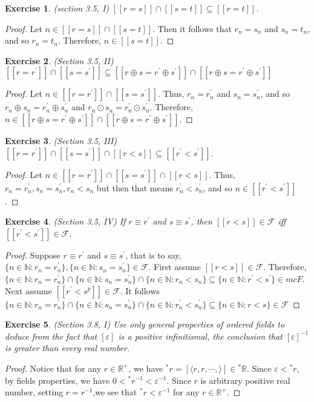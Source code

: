\documentclass[a4paper, 11pt, openany]{book}
\theoremstyle{plain}
\newtheorem{exercise}{Exercise}[chapter]
\theoremstyle{plain}
\newcommand{\mc}{\mathcal}
\newcommand{\N}{\mathbb{N}}
\newcommand{\R}{\mathbb{R}}
\newcommand{\la}{\langle}
\newcommand{\ra}{\rangle}
\newcommand{\op}{\oplus}
\newcommand{\od}{\odot}
\newcommand{\p}{\prime}
\newcommand{\ep}{\varepsilon}
\begin{document}
  \begin{exercise}
    (section 3.5, I)
    $[[r=s]] \cap [[s=t]] \subseteq [[r=t]]$.
  \end{exercise}
  \begin{proof}
    Let $n \in [[r=s]] \cap [[s=t]]$. Then it follows that $r_n=s_n$ and $s_n=t_n$, and so $r_n=t_n$. Therefore, $n \in [[s=t]]$.
  \end{proof}

  \begin{exercise} (Section 3.5, II)
    $[[r=r^\p]] \cap [[s=s^\p]] \subseteq [[r \op s=r^\p \op s^\p]] \cap [[r \op s=r^\p \op s^\p]]$
  \end{exercise}
  \begin{proof}
    Let $n \in [[r=r^\p]] \cap [[s=s^\p]]$. Thus, $r_n=r_n^\p$ and $s_n=s_n^\p$, and so $r_n \op s_n=r_n^\p \op s_n^\p$ and $r_n \od s_n = r_n^\p \od s_n^\p$. Therefore, $n \in [[r \op s=r^\p \op s^\p]] \cap [[r \op s=r^\p \op s^\p]]$.
  \end{proof}
  \begin{exercise}
    (Section 3.5, III)
    $[[r=r^\p]] \cap [[s=s^\p]] \cap [[r<s]] \subseteq [[r^\p<s^\p]]$.
  \end{exercise}
  \begin{proof}
    Let $n \in [[r=r^\p]] \cap [[s=s^\p]] \cap [[r<s]]$. Thus, $r_n=r_n^\p, s_n=s_n^\p, r_n<s_n$ but then that means $r_n^\p<s_n^\p$, and so $ n \in [[r^\p<s^\p]]$.
  \end{proof}
  \begin{exercise} (Section 3.5, IV)
    If $r \equiv r^\p$ and $s \equiv s^\p$, then $[[r<s]] \in \mc{F}$ iff $[[r^\p<s^\p]] \in \mc{F}$.
  \end{exercise}
  \begin{proof}
    Suppose $r \equiv r^\p$ and $s \equiv s^\p$, that is to say, $\{n \in \N: r_n=r_n^\p\}, \{n \in \N: s_n=s_n^\p\} \in \mc{F}$. First assume $[[r<s]] \in \mc{F}$. Therefore, $\{n \in \N: r_n=r_n^\p\} \cap \{n \in \N: s_n=s_n^\p\} \cap \{n \in \N: r_n<s_n\} \subseteq \{n \in \N: r^\p<s^\p \} \in mc{F}$. Next assume $[[r^\p<s^p]] \in \mc{F}$. It follows $\{n \in \N: r_n=r_n^\p\} \cap \{n \in \N: s_n=s_n^\p\} \cap \{n \in \N: r_n^\p<s_n^\p\} \subseteq \{n \in \N: r<s\} \in \mc{F}$
  \end{proof}

  \begin{exercise}
    (Section 3.8, I)
    Use only general properties of ordered fields to deduce from the fact that $[\ep]$ is a positive infinitismal, the conclusion that $[\ep]^{-1}$ is greater than every real number.
  \end{exercise}
  \begin{proof}
    Notice that for any $r \in \R^+$, we have ${}^* r=[\la r,r,\cdots,\ra] \in {}^* \R$. Since $\ep<{}^* r$, by fields properties, we have $0<{}^* r^{-1}<\ep^{-1}$. Since $r$ is arbitrary positive real number, setting $r=r^{-1}$,we see that ${}^* r< \ep^{-1}$ for any $r \in \R^+$. 
  \end{proof}
  
\end{document}

